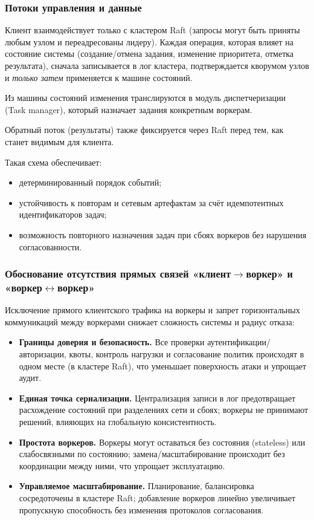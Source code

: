 \subsubsection{Потоки управления и данные}

Клиент взаимодействует только с кластером Raft (запросы могут быть приняты
любым узлом и переадресованы лидеру). Каждая операция, которая влияет на
состояние системы (создание/отмена задания, изменение приоритета, отметка
результата), сначала записывается в лог кластера, подтверждается кворумом узлов
и \emph{только затем} применяется к машине состояний.

Из машины состояний изменения транслируются в модуль диспетчеризации (Task
manager), который назначает задания конкретным воркерам.

Обратный поток (результаты) также фиксируется через Raft перед тем, как станет
видимым для клиента.

Такая схема обеспечивает:
\begin{itemize}
    \item детерминированный порядок событий;
    \item устойчивость к повторам и сетевым артефактам за счёт идемпотентных
    идентификаторов задач;
    \item возможность повторного назначения задач при сбоях воркеров без
    нарушения согласованности.
\end{itemize}

\subsubsection{Обоснование отсутствия прямых связей «клиент$\rightarrow$воркер» и
«воркер$\leftrightarrow$воркер»}

Исключение прямого клиентского трафика на воркеры и запрет горизонтальных
коммуникаций между воркерами снижает сложность системы и радиус отказа:

\begin{itemize}
  \item \textbf{Границы доверия и безопасность.} Все проверки
  аутентификации/авторизации, квоты, контроль нагрузки и согласование политик
  происходят в одном месте (в кластере Raft), что уменьшает поверхность атаки и
  упрощает аудит.
  \item \textbf{Единая точка сериализации.} Централизация записи в лог
  предотвращает расхождение состояний при разделениях сети и сбоях; воркеры не
  принимают решений, влияющих на глобальную консистентность.
  \item \textbf{Простота воркеров.} Воркеры могут оставаться без состояния
  (stateless) или слабосвязными по состоянию; замена/масштабирование происходит
  без координации между ними, что упрощает эксплуатацию.
  \item \textbf{Управляемое масштабирование.} Планирование, балансировка
  сосредоточены в кластере Raft; добавление воркеров линейно увеличивает
  пропускную способность без изменения протоколов согласования.
\end{itemize}

